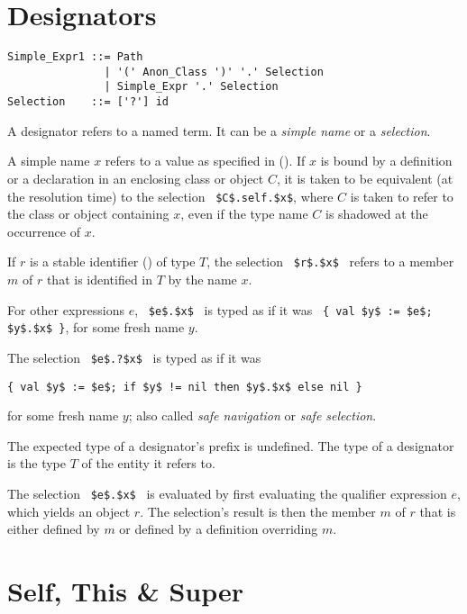 \section{Designators}
\label{sec:designators}

\syntax\begin{lstlisting}
Simple_Expr1 ::= Path
               | '(' Anon_Class ')' '.' Selection
               | Simple_Expr '.' Selection
Selection    ::= ['?'] id
\end{lstlisting}

A designator refers to a named term. It can be a {\em simple name} or a {\em selection}.

A simple name $x$ refers to a value as specified in (). If $x$ is bound by a definition or a declaration in an enclosing class or object $C$, it is taken to be equivalent (at the resolution time) to the selection ~\lstinline!$C$.self.$x$!, where $C$ is taken to refer to the class or object containing $x$, even if the type name $C$ is shadowed at the occurrence of $x$. 

If $r$ is a stable identifier () of type $T$, the selection ~\lstinline!$r$.$x$!~ refers to a member $m$ of $r$ that is identified in $T$ by the name $x$. 

For other expressions $e$, ~\lstinline!$e$.$x$!~ is typed as if it was ~\lstinline!{ val $y$ := $e$; $y$.$x$ }!, for some fresh name $y$. 

The selection ~\lstinline!$e$.?$x$!~ is typed as if it was 
\begin{lstlisting}
{ val $y$ := $e$; if $y$ != nil then $y$.$x$ else nil }
\end{lstlisting}
for some fresh name $y$; also called {\em safe navigation} or {\em safe selection}. 

The expected type of a designator's prefix is undefined. The type of a designator is the type $T$ of the entity it refers to. 

The selection ~\lstinline!$e$.$x$!~ is evaluated by first evaluating the qualifier expression $e$, which yields an object $r$. The selection's result is then the member $m$ of $r$ that is either defined by $m$ or defined by a definition overriding $m$. 







\section{Self, This \& Super}
\label{sec:self-this-super}

